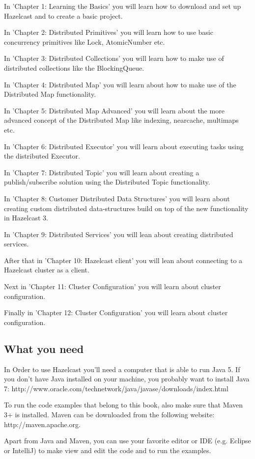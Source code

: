 In 'Chapter 1: Learning the Basics' you will learn how to download and set up Hazelcast and to create a basic project.

In 'Chapter 2: Distributed Primitives' you will learn how to use basic concurrency primitives like Lock, AtomicNumber etc.

In 'Chapter 3: Distributed Collections' you will learn how to make use of distributed collections like the BlockingQueue.

In 'Chapter 4: Distributed Map' you will learn about how to make use of the Distributed Map functionality.

In 'Chapter 5: Distributed Map Advanced' you will learn about the more advanced concept of the Distributed Map like indexing, nearcache, multimaps etc.

In 'Chapter 6: Distributed Executor' you will learn about executing tasks using the distributed Executor.

In 'Chapter 7: Distributed Topic' you will learn about creating a publish/subscribe solution using the Distributed Topic functionality.

In 'Chapter 8: Customer Distributed Data Structures' you will learn about creating custom distributed data-structures build on top of the new functionality in Hazelcast 3.

In 'Chapter 9: Distributed Services' you will lean about creating distributed services.

After that in  'Chapter 10: Hazelcast client' you will lean about connecting to a Hazelcast cluster as a client.

Next in 'Chapter 11: Cluster Configuration' you will learn about cluster configuration.

Finally in 'Chapter 12: Cluster Configuration' you will learn about cluster configuration.

\subsection*{What you need}
In Order to use Hazelcast you'll need a computer that is able to run Java 5. If you don't have Java installed on your machine, you probably want to install Java 7: 
http://www.oracle.com/technetwork/java/javase/downloads/index.html

To run the code examples that belong to this book, also make sure that Maven 3+ is installed. Maven can be downloaded from the following website: 
http://maven.apache.org.

Apart from Java and Maven, you can use your favorite editor or IDE (e.g. Eclipse or IntelliJ) to make view and edit the code and to run the examples. 

